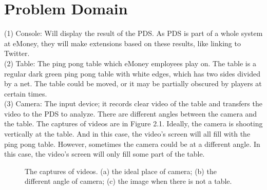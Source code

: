 \documentclass[11pt]{report}
\begin{document}
\section{Problem Domain}
(1)	Console: Will display the result of the PDS. As PDS is part of a whole system at eMoney, they will make extensions based on these results, like linking to Twitter.\\
(2)	Table: The ping pong table which eMoney employees play on. The table is a regular dark green ping pong table with white edges, which has two sides divided by a net.  The table could be moved, or it may be partially obscured by players at certain times.\\
(3)	Camera: The input device; it records clear video of the table and transfers the video to the PDS to analyze. There are different angles between the camera and the table. The captures of videos are in Figure 2.1. Ideally, the camera is shooting vertically at the table. And in this case, the video's screen will all fill with the ping pong table. However, sometimes the camera could be at a different angle. In this case, the video's screen will only fill some part of the table.\\
\begin{figure}[float]
\centering
{}
\caption{ \small{The captures of videos. (a) the ideal place of camera; (b) the different angle of camera; (c) the image when there is not a table.}}
\end{figure}
\end{document}
